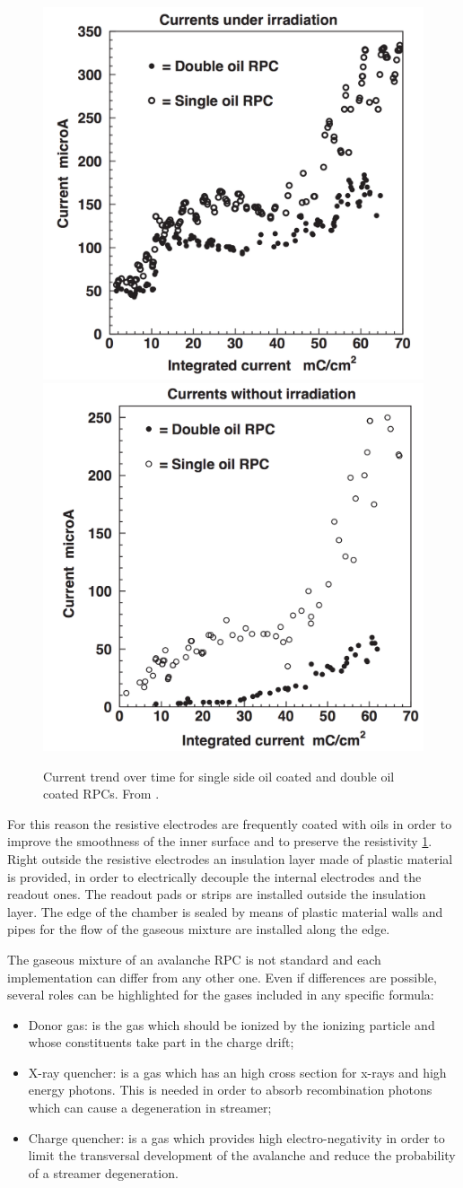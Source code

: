 \begin{figure}[!t]
\begin{center}
\includegraphics[width=0.47\linewidth]{Chapters/Performance/Figs/oil_irradiation.png}
\includegraphics[width=0.47\linewidth]{Chapters/Performance/Figs/oil_no_irradiation.png}
\caption{Current trend over time for single side oil coated and double oil coated RPCs. From \cite{aliceRPC:2004}.}
\label{fig:RPCoil}
\end{center}
\end{figure}

For this reason the resistive electrodes are frequently coated with oils in order to improve the smoothness of the inner surface and to preserve the resistivity \ref{fig:RPCoil}.
Right outside the resistive electrodes an insulation layer made of plastic material is provided, in order to electrically decouple the internal electrodes and the readout ones.
The readout pads or strips are installed outside the insulation layer.
The edge of the chamber is sealed by means of plastic material walls and pipes for the flow of the gaseous mixture are installed along the edge.

The gaseous mixture of an avalanche RPC is not standard and each implementation can differ from any other one.
Even if differences are possible, several roles can be highlighted for the gases included in any specific formula:
\begin{itemize}
\item Donor gas: is the gas which should be ionized by the ionizing particle and whose constituents take part in the charge drift;
\item X-ray quencher: is a gas which has an high cross section for x-rays and high energy photons. This is needed in order to absorb recombination photons which can cause a degeneration in streamer;
\item Charge quencher: is a gas which provides high electro-negativity in order to limit the transversal development of the avalanche and reduce the probability of a streamer degeneration.
\end{itemize}


